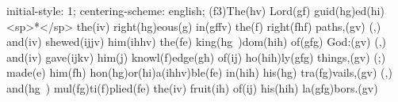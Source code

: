 initial-style: 1;
centering-scheme: english;
(f3)The(hv) Lord(gf) guid(hg)ed(hi) <sp>*</sp> the(iv) right(hg)eous(g) in(gffv) the(f) right(fhf) paths,(gv) (,) and(iv) shewed(ijjv) him(ihhv) the(fe) king(hg~)dom(hih) of(gfg) God:(gv) (,) and(iv) gave(ijkv) him(j) knowl(f)edge(gh) of(ij) ho(hih)ly(gfg) things,(gv) (;) made(e) him(fh) hon(hg)or(hi)a(ihhv)ble(fe) in(hih) his(hg) tra(fg)vails,(gv) (,) and(hg~) mul(fg)ti(f)plied(fe) the(iv) fruit(ih) of(ij) his(hih) la(gfg)bors.(gv)

